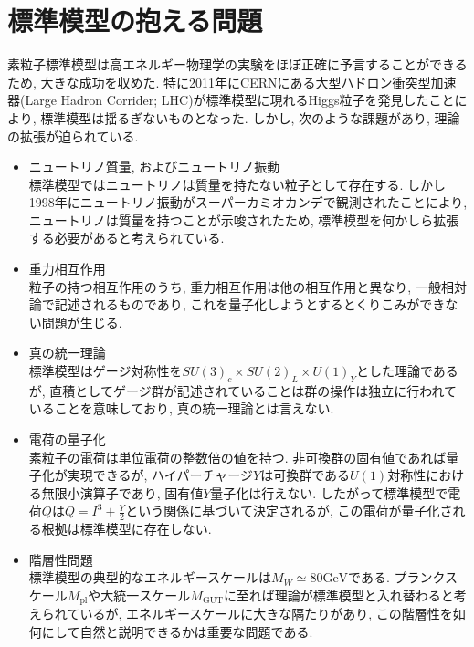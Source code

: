 %
%
\section{標準模型の抱える問題}
素粒子標準模型は高エネルギー物理学の実験をほぼ正確に予言することができるため, 大きな成功を収めた.
特に2011年にCERNにある大型ハドロン衝突型加速器(Large Hadron Corrider; LHC)が標準模型に現れるHiggs粒子を発見したことにより, 標準模型は揺るぎないものとなった.
しかし, 次のような課題があり, 理論の拡張が迫られている.
\begin{itemize}
        \item ニュートリノ質量, およびニュートリノ振動\\
              標準模型ではニュートリノは質量を持たない粒子として存在する.
              しかし1998年にニュートリノ振動がスーパーカミオカンデで観測されたことにより, ニュートリノは質量を持つことが示唆されたため, 標準模型を何かしら拡張する必要があると考えられている.
      \item 重力相互作用\\
            粒子の持つ相互作用のうち, 重力相互作用は他の相互作用と異なり, 一般相対論で記述されるものであり, これを量子化しようとするとくりこみができない問題が生じる.
      \item 真の統一理論\\
            標準模型はゲージ対称性を$SU(3)_c\times SU(2)_L\times U(1)_Y$とした理論であるが, 直積としてゲージ群が記述されていることは群の操作は独立に行われていることを意味しており, 真の統一理論とは言えない.
      \item 電荷の量子化\\
            素粒子の電荷は単位電荷の整数倍の値を持つ.
            非可換群の固有値であれば量子化が実現できるが, ハイパーチャージ$Y$は可換群である$U(1)$対称性における無限小演算子であり, 固有値$Y$量子化は行えない.
            したがって標準模型で電荷$Q$は$Q = I^3 + \frac{Y}{2}$という関係に基づいて決定されるが, この電荷が量子化される根拠は標準模型に存在しない.
      \item 階層性問題\\
            標準模型の典型的なエネルギースケールは$M_W\simeq 80\text{GeV}$である.
	    プランクスケール$M_{\mathrm{pl}}$や大統一スケール$M_{\mathrm{GUT}}$に至れば理論が標準模型と入れ替わると考えられているが, エネルギースケールに大きな隔たりがあり, この階層性を如何にして自然と説明できるかは重要な問題である.

\end{itemize}
